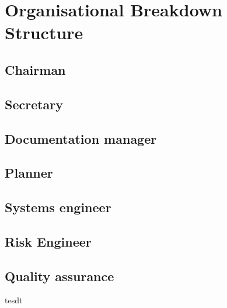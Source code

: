 \section{Organisational Breakdown Structure}\label{cha:OBS}

\subsection{Chairman}\label{par:Chairman}


\subsection{Secretary}\label{par:Secretary}


\subsection{Documentation manager}\label{par:D_and_A}


\subsection{Planner}\label{par:Planner}


\subsection{Systems engineer}\label{par:SE}


\subsection{Risk Engineer}\label{par:RiskEng}


\subsection{Quality assurance}\label{par:QA}



tesdt
